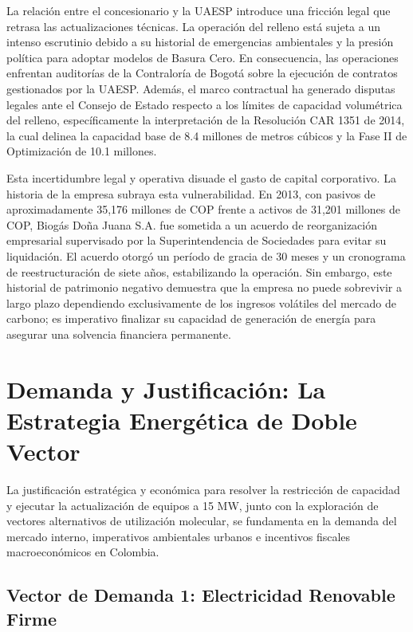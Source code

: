 \documentclass[11pt,letterpaper]{article}
\begin{document}
La relación entre el concesionario y la UAESP introduce una fricción legal que
retrasa las actualizaciones técnicas. La operación del relleno está sujeta a un
intenso escrutinio debido a su historial de emergencias ambientales y la presión
política para adoptar modelos de Basura Cero. En consecuencia, las operaciones
enfrentan auditorías de la Contraloría de Bogotá sobre la ejecución de contratos
gestionados por la UAESP. Además, el marco contractual ha generado disputas
legales ante el Consejo de Estado respecto a los límites de capacidad
volumétrica del relleno, específicamente la interpretación de la Resolución CAR
1351 de 2014, la cual delinea la capacidad base de 8.4 millones de metros
cúbicos y la Fase II de Optimización de 10.1 millones.

Esta incertidumbre legal y operativa disuade el gasto de capital corporativo. La
historia de la empresa subraya esta vulnerabilidad. En 2013, con pasivos de
aproximadamente 35,176 millones de COP frente a activos de 31,201 millones de
COP, Biogás Doña Juana S.A. fue sometida a un acuerdo de reorganización
empresarial supervisado por la Superintendencia de Sociedades para evitar su
liquidación. El acuerdo otorgó un período de gracia de 30 meses y un cronograma
de reestructuración de siete años, estabilizando la operación. Sin embargo, este
historial de patrimonio negativo demuestra que la empresa no puede sobrevivir a
largo plazo dependiendo exclusivamente de los ingresos volátiles del mercado de
carbono; es imperativo finalizar su capacidad de generación de energía para
asegurar una solvencia financiera permanente.

\newpage

\section{Demanda y Justificación: La Estrategia Energética de Doble Vector}

La justificación estratégica y económica para resolver la restricción de
capacidad y ejecutar la actualización de equipos a 15 MW, junto con la
exploración de vectores alternativos de utilización molecular, se fundamenta en
la demanda del mercado interno, imperativos ambientales urbanos e incentivos
fiscales macroeconómicos en Colombia.

\subsection{Vector de Demanda 1: Electricidad Renovable Firme}
\end{document}
